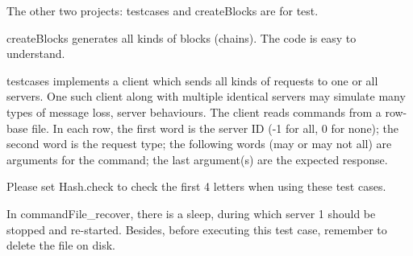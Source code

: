 \documentclass{article}
\begin{document}
The other two projects: testcases and createBlocks are for test.

createBlocks generates all kinds of blocks (chains).
The code is easy to understand.

testcases implements a client which sends all kinds of requests to one or all servers.
One such client along with multiple identical servers may simulate many types of message loss, server behaviours.
The client reads commands from a row-base file.
In each row, the first word is the server ID (-1 for all, 0 for none); the second word is the request type; the following words (may or may not all) are arguments for the command; the last argument(s) are the expected response.

Please set Hash.check to check the first 4 letters when using these test cases.

In commandFile\_recover, there is a sleep, during which server 1 should be stopped and re-started.
Besides, before executing this test case, remember to delete the file on disk.

\label{LastPage}
\end{document}

